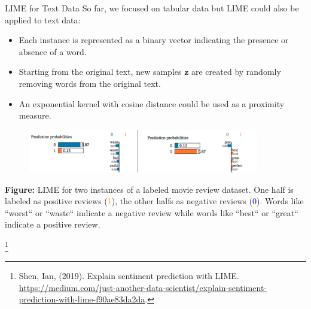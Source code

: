 \documentclass[11pt,compress,t,notes=noshow, xcolor=table]{beamer}
\newcommand{\zv}{\mathbf{z}}
\begin{document}
%
%
%

\begin{vbframe}{LIME for Text Data}
	So far, we focused on tabular data but LIME could also be applied to text data: 
	\begin{itemize}
		\item Each instance is represented as a binary vector indicating the presence or absence of a word.
		\item Starting from the original text, new samples $\zv$ are created by randomly removing words from the original text.
		\item An exponential kernel with cosine distance could be used as a proximity measure. 
	\end{itemize}
	
	\begin{figure}
		\begin{center}
			\includegraphics[width=0.9\textwidth]{figure/lime_movier}
		\end{center}
	\end{figure}
	
	
	\scriptsize{\textbf{Figure:} LIME for two instances of a labeled movie review dataset. One half is labeled as positive reviews (\textcolor{orange}{1}), 
		the other halfs as negative reviews (\textcolor{blue}{0}). Words like ``worst`` or ``waste`` indicate a negative review while words like ``best`` or ``great`` indicate a positive review.}
	
	\footnote[frame]{Shen, Ian, (2019). Explain sentiment prediction with LIME.
		\url{https://medium.com/just-another-data-scientist/explain-sentiment-prediction-with-lime-f90ae83da2da}.}
	
	
	\end{vbframe}
	
\end{document}
